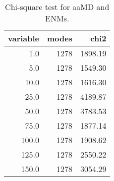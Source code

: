 \begin{table}[center]
\centering
\caption{Chi-square test for aaMD and ENMs.}
\label{tab:chi2}
\begin{tabular}{rrr}
\toprule
 variable &  modes &    chi2 \\
\midrule
      1.0 &   1278 & 1898.19 \\
      5.0 &   1278 & 1549.30 \\
     10.0 &   1278 & 1616.30 \\
     25.0 &   1278 & 4189.87 \\
     50.0 &   1278 & 3783.53 \\
     75.0 &   1278 & 1877.14 \\
    100.0 &   1278 & 1908.62 \\
    125.0 &   1278 & 2550.22 \\
    150.0 &   1278 & 3054.29 \\
\bottomrule
\end{tabular}
\end{table}
